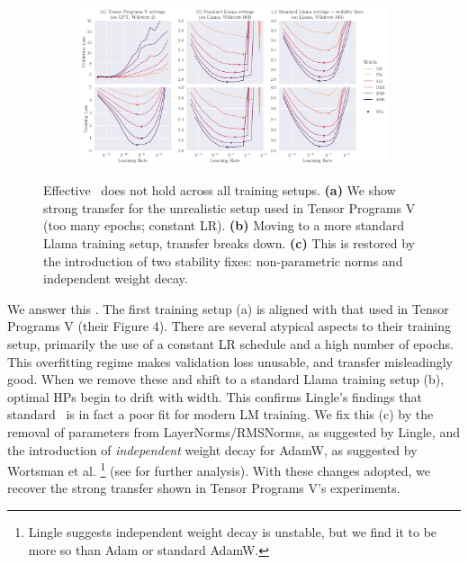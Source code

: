 \begin{figure}
    \centering
    \begin{subfigure}{\textwidth}
        \centering
        \includegraphics[width=\textwidth]{arXiv/figures/fig_TPV_improvements.pdf}
    \end{subfigure}
    \caption{Effective \mut\ does not hold across all training setups.
    \textbf{(a)} We show strong transfer for the unrealistic setup used in Tensor Programs V (too many epochs; constant LR). \textbf{(b)} Moving to a more standard Llama training setup, transfer breaks down. \textbf{(c)} This is restored by the introduction of two stability fixes: non-parametric norms and independent weight decay.}
    \label{fig:experiments:tpv_setup}
\end{figure}

We answer this . The first training setup (a) is aligned with that used in Tensor Programs V (their Figure 4). There are several atypical aspects to their training setup, primarily the use of a constant LR schedule and a high number of epochs. This overfitting regime makes validation loss unusable, and transfer misleadingly good. When we remove these and shift to a standard Llama training setup (b), optimal HPs begin to drift with width. This confirms Lingle's findings that standard \mup\ is in fact a poor fit for modern LM training. We fix this (c) by the removal of parameters from LayerNorms/RMSNorms, as suggested by Lingle, and the introduction of \textit{independent} weight decay for AdamW, as suggested by Wortsman et al. \citep{Small_Scale_Proxies} \footnote{Lingle suggests independent weight decay is unstable, but we find it to be more so than Adam or standard AdamW.} (see \citep{AdamW_Weight_Decay} for further analysis). With these changes adopted, we recover the strong transfer shown in Tensor Programs V's experiments.

